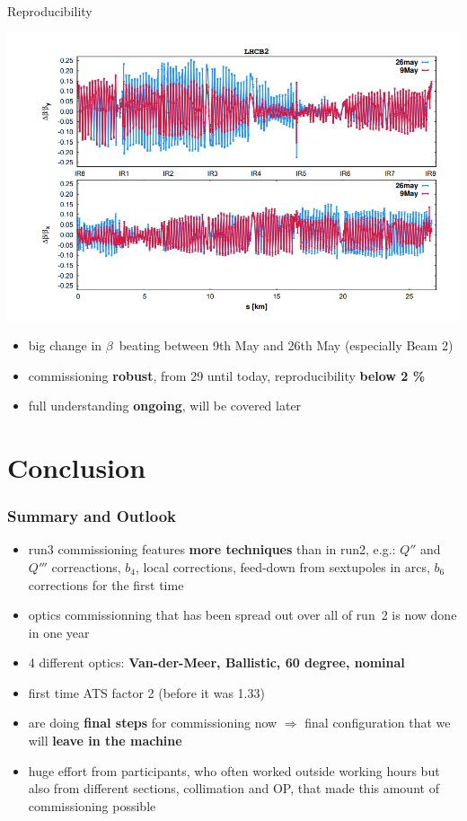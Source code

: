 \documentclass[4pt,usenames,dvipsnames,aspectratio=169,table]{beamer}
\newcommand{\highl}[1]{\textbf{#1}}
\begin{document}
\begin{frame}{Reproducibility}

    \includegraphics[width=0.6\linewidth]{images/reproducibility/B2_26May_9May.png}

\begin{itemize}
    \item big change in $\beta$~beating between 9th May and 26th May (especially Beam 2)
    \item  commissioning \highl{robust}, from 29 until today, reproducibility \highl{below 2 \%}
    \item  full understanding \highl{ongoing}, will be covered later
\end{itemize}

    
\end{frame}

\section{Conclusion}

\begin{frame}
    \frametitle{Summary and Outlook}

    \begin{itemize}
        \item run3 commissioning features \highl{more techniques} than in run2, e.g.: $Q''$ and $Q'''$ correactions, $b_4$,
        local corrections,
        feed-down from sextupoles in arcs, 
        $b_6$ corrections for the first time
        \item optics commissionning that has been spread out over all of run~2 is now done in one year
        \item 4 different optics: \highl{Van-der-Meer, Ballistic, 60 degree, nominal}
        \item first time ATS factor 2 (before it was 1.33)
        \item are doing \highl{final steps} for commissioning now
        $\Rightarrow$ final configuration that we will \highl{leave in the machine}
        
        \item huge effort from participants, who often worked outside working hours but also from different sections, collimation and OP, that made this amount of commissioning possible
    \end{itemize}

\end{frame}
\end{document}
